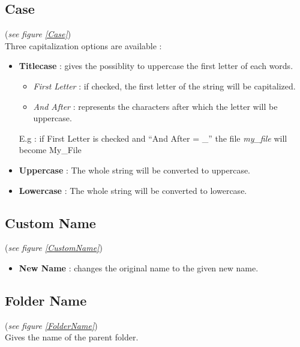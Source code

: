\documentclass[10pt, a4paper]{scrartcl}
\begin{document}
\subsection*{Case}
(\emph{see figure \ref{Case}})\\
Three capitalization options are available :
\begin{itemize}
        \item \textbf{Titlecase} : gives the possiblity to uppercase the first letter of each words.
                \begin{itemize}
                        \item \emph{First Letter} : if checked, the first letter of the string will be capitalized. 
                        \item \emph{And After} : represents the characters after which the letter will be uppercase. 
                \end{itemize}
                E.g : if First Letter is checked and ``And After = \_'' the file \emph{my\_file} will become My\_File
        \item \textbf{Uppercase} : The whole string will be converted to uppercase.
        \item \textbf{Lowercase} : The whole string will be converted to lowercase.
\end{itemize}

\subsection*{Custom Name}
(\emph{see figure \ref{CustomName}})\\
\begin{itemize}
        \item \textbf{New Name} : changes the original name to the given new name.
\end{itemize}

\subsection*{Folder Name}
(\emph{see figure \ref{FolderName}})\\
Gives the name of the parent folder.
\end{document}
